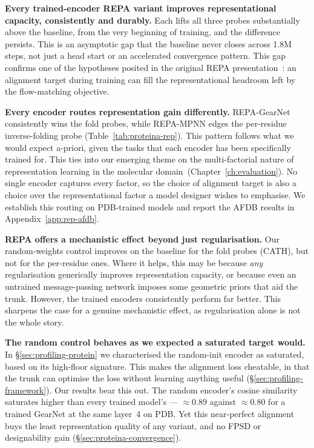 \documentclass[12pt,a4paper,twoside]{report}
\begin{document}


\textbf{Every trained-encoder REPA variant improves representational capacity, consistently and durably.} Each lifts all three probes substantially above the baseline, from the very beginning of training, and the difference persists. This is an asymptotic gap that the baseline never closes across 1.8M steps, not just a head start or an accelerated convergence pattern. This gap confirms one of the hypotheses posited in the original REPA presentation~\cite{REPA}: an alignment target during training can fill the representational headroom left by the flow-matching objective.

\textbf{Every encoder routes representation gain differently.} REPA-GearNet consistently wins the fold probes, while REPA-MPNN edges the per-residue inverse-folding probe (Table~\ref{tab:proteina-rep}). This pattern follows what we would expect a-priori, given the tasks that each encoder has been specifically trained for. This ties into our emerging theme on the multi-factorial nature of representation learning in the molecular domain~(Chapter~\ref{ch:evaluation}). No single encoder captures every factor, so the choice of alignment target is also a choice over the representational factor a model designer wishes to emphasise. We establish this routing on PDB-trained models and report the AFDB results in Appendix~\ref{app:rep-afdb}.



\textbf{REPA offers a mechanistic effect beyond just regularisation.} Our random-weights control improves on the baseline for the fold probes (CATH), but not for the per-residue ones. Where it helps, this may be because \emph{any} regularisation generically improves representation capacity, or because even an untrained message-passing network imposes some geometric priors that aid the trunk. However, the trained encoders consistently perform far better. This sharpens the case for a genuine mechanistic effect, as regularisation alone is not the whole story.

\textbf{The random control behaves as we expected a saturated target would.} In \S\ref{sec:profiling-protein} we characterised the random-init encoder as saturated, based on its high-floor signature. This makes the alignment loss cheatable, in that the trunk can optimise the loss without learning anything useful (\S\ref{sec:profiling-framework}). Our results bear this out. The random encoder's cosine similarity saturates higher than every trained model's --- ${\approx}0.89$ against ${\approx}0.80$ for a trained GearNet at the same layer~4 on PDB. Yet this near-perfect alignment buys the least representation quality of any variant, and no FPSD or designability gain (\S\ref{sec:proteina-convergence}).
\end{document}
